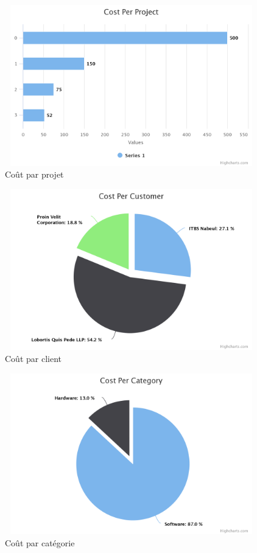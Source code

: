 \begin{figure}[H]
\center
\includegraphics[width=11cm,height=7cm]{./figures/pres/cost-per-project.png}
\caption{ Co\^{u}t par projet }
\end{figure}



\begin{figure}[H]
\center
\includegraphics[width=11cm,height=7cm]{./figures/pres/cost-per-customer.png}
\caption{ Co\^{u}t par client }
\end{figure}

\begin{figure}[H]
\center
\includegraphics[width=11cm,height=7cm]{./figures/pres/cost-per-category.png}
\caption{ Co\^{u}t par cat\'{e}gorie}
\end{figure}



